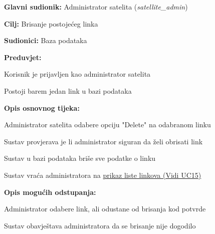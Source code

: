 					\noindent {}
				\begin{packed_item}
					
					\item \textbf{Glavni sudionik: }Administrator satelita (\textit{satellite\_admin})
					\item  \textbf{Cilj: }Brisanje postojećeg linka
					\item  \textbf{Sudionici: }Baza podataka
					\item  \textbf{Preduvjet: }
					\begin{packed_enum}
						\item Korisnik je prijavljen kao administrator satelita
						\item Postoji barem jedan link u bazi podataka	\end{packed_enum}
					\item  \textbf{Opis osnovnog tijeka: }
					
					\item[] \begin{packed_enum}
						
						\item Administrator satelita odabere opciju "Delete" na odabranom linku
						\item Sustav provjerava je li administrator siguran da želi obrisati link 
						\item Sustav u bazi podataka briše sve podatke o linku 
						\item Sustav vraća administratora na \hyperref[UC15]{prikaz liste linkova (Vidi UC15)} 
						
					\end{packed_enum}
					
					\item  \textbf{Opis mogućih odstupanja: }
					
					\item[] \begin{packed_enum}
						
							\item[1] Administrator odabere link, ali odustane od brisanja kod potvrde
						\item[ ] \begin{packed_enum}
							
							\item[1.1] Sustav obavještava administratora da se brisanje nije dogodilo
						\end{packed_enum}
					\end{packed_enum}
				\end{packed_item}
